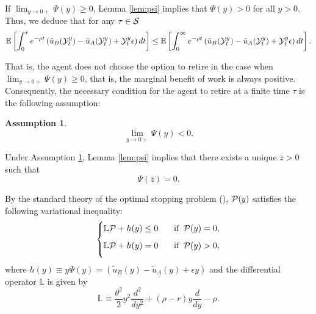\documentclass[a4paper,report, 11pt]{article}
\newtheorem{as}{Assumption}
\def\e{\epsilon}
\def\t{\theta}
\begin{document}
If $\lim_{y\to 0+} \Psi(y) \ge 0$, Lemma \ref{lem:psi} implies that $\Psi(y)>0$ for all $y>0$. Thus, we deduce that for any $\tau\in{\cal S}$
\begin{equation*}
\mathbb{E}\left[\int_0^\tau e^{-\rho t}\left(\tilde{u}_B({\cal Y}_t^y )-\tilde{u}_A({\cal Y}_t^y)+{\cal Y}_t^y \e\right)dt\right]\le \mathbb{E}\left[\int_0^\infty e^{-\rho t}\left(\tilde{u}_B({\cal Y}_t^y )-\tilde{u}_A({\cal Y}_t^y)+{\cal Y}_t^y \e\right)dt\right].
\end{equation*}

That is, the agent does not choose the option to retire in the case when $\lim_{y\to 0+} \Psi(y) \ge 0$, that is, the marginal benefit of work is always positive. Consequently, the necessary condition for the agent to retire at a finite time $\tau$ is  the following assumption:
\begin{as}\label{as:limit-psi}
	$$\lim_{y\to0+}\Psi(y) <0.$$
\end{as}

Under Assumption \ref{as:limit-psi}, Lemma \ref{lem:psi} implies that there exists a unique $\bar{z}>0$ such that 
$$
\Psi(\bar{z})=0. 
$$

By the standard theory of the optimal stopping problem (\citet{PS}), ${\cal P}(y)$ satisfies the following variational inequality:
\begin{align}
\begin{cases}\label{eq:VI}
\mathbb{L}{\cal P}+h(y) \le 0\;\;\;&\mbox{if}\;\;{\cal P}(y)=0, \vspace{2mm}\\
\mathbb{L}{\cal P}+h(y) = 0\;\;\;&\mbox{if}\;\;{\cal P}(y)>0,\vspace{2mm}\\
\end{cases}
\end{align}
 where $h(y)\equiv y\Psi(y)=(\tilde{u}_B(y)-\tilde{u}_A(y)+\e y)$ and the differential operator $\mathbb{L}$ is given by 
\begin{equation*}
\mathbb{L}\equiv \dfrac{\t^2}{2}y^2\dfrac{d^2}{dy^2} + (\rho-r)y\dfrac{d}{dy} - \rho.
\end{equation*}
\end{document}
